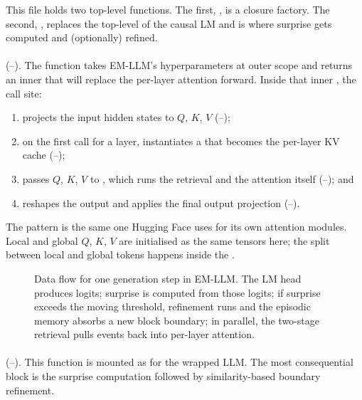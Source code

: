 This file holds two top-level functions. The first, , is a closure factory. The second, , replaces the top-level  of the causal LM and is where surprise gets computed and (optionally) refined.

\paragraph{} (--). The function takes EM-LLM's hyperparameters at outer scope and returns an inner  that will replace the per-layer attention forward. Inside that inner , the call site:
\begin{enumerate}
  \item projects the input hidden states to $Q$, $K$, $V$ (--);
  \item on the first call for a layer, instantiates a  that becomes the per-layer KV cache (--);
  \item passes $Q$, $K$, $V$ to , which runs the retrieval and the attention itself (--); and
  \item reshapes the output and applies the final output projection (--).
\end{enumerate}
The pattern is the same one Hugging Face uses for its own attention modules. Local and global $Q$, $K$, $V$ are initialised as the same tensors here; the split between local and global tokens happens inside the .

\begin{figure}[h]
\centering

\caption{Data flow for one generation step in EM-LLM. The LM head produces logits; surprise is computed from those logits; if surprise exceeds the moving threshold, refinement runs and the episodic memory absorbs a new block boundary; in parallel, the two-stage retrieval pulls events back into per-layer attention.}
\label{fig:inference-loop}
\end{figure}

\paragraph{} (--). This function is mounted as  for the wrapped LLM. The most consequential block is the surprise computation followed by similarity-based boundary refinement.

